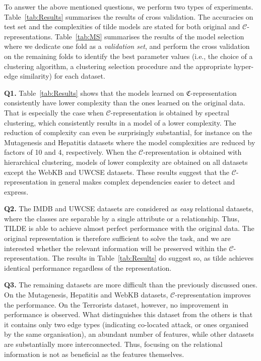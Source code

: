 To answer the above mentioned questions, we perform two types of experiments.
Table~\ref{tab:Results} summarises the results of cross validation.
The accuracies on test set and the complexities of \gls{tilde} models are stated for both original and $\mathcal{C}$-representations.
Table~\ref{tab:MS} summarises the results of the model selection where we dedicate one fold as a \textit{validation set}, and perform the cross validation on the remaining folds to identify the best parameter values (i.e., the choice of a clustering algorithm, a clustering selection procedure and the appropriate hyper-edge similarity) for each dataset.

\textbf{Q1.}
Table~\ref{tab:Results} shows that the models learned on $\mathfrak{C}$-representation consistently have lower complexity than the ones learned on the original data.
That is especially the case when $\mathcal{C}$-representation is obtained by spectral clustering, which consistently results in a model of a lower complexity.
The reduction of complexity can even be surprisingly substantial, for instance on the Mutagenesis and Hepatitis datasets where the model complexities are reduced by factors of 10 and 4, respectively.
When the $\mathcal{C}$-representation is obtained with hierarchical clustering, models of lower complexity are obtained on all datasets except the WebKB and UWCSE datasets.
These results suggest that the $\mathcal{C}$-representation in general makes complex dependencies easier to detect and express.




\textbf{Q2.}
The IMDB and UWCSE datasets are considered as \textit{easy} relational datasets, where the classes are separable by a single attribute or a relationship.
Thus, TILDE is able to achieve almost perfect performance  with the original data.
The original representation is therefore sufficient to solve the task, and we are interested whether  the relevant information will be preserved within the $\mathcal{C}$-representation.
The results in Table~\ref{tab:Results} do suggest so, as \gls{tilde} achieves identical performance regardless of the representation.



\textbf{Q3.}
The remaining datasets are more difficult than the previously discussed ones.
On the Mutagenesis, Hepatitis and WebKB datasets, $\mathcal{C}$-representation improves the performance.
On the Terrorists dataset, however, no improvement in performance is observed.
What distinguishes this dataset from the others is that it contains only two edge types (indicating co-located attack, or ones organised by the same organisation), an abundant number of features, while other datasets are substantially more interconnected.
Thus, focusing on the relational information is not as beneficial as the features themselves.

